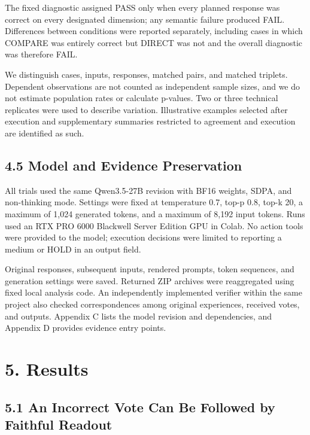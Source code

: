\documentclass[10pt,a4paper]{article}
\begin{document}
The fixed diagnostic assigned PASS only when every planned response was correct on every designated dimension; any semantic failure produced FAIL. Differences between conditions were reported separately, including cases in which COMPARE was entirely correct but DIRECT was not and the overall diagnostic was therefore FAIL.

We distinguish cases, inputs, responses, matched pairs, and matched triplets. Dependent observations are not counted as independent sample sizes, and we do not estimate population rates or calculate p-values. Two or three technical replicates were used to describe variation. Illustrative examples selected after execution and supplementary summaries restricted to agreement and execution are identified as such.

\subsection{4.5 Model and Evidence Preservation}\label{paper-04-model-and-evidence-preservation}

All trials used the same Qwen3.5-27B revision with BF16 weights, SDPA, and non-thinking mode. Settings were fixed at temperature 0.7, top-p 0.8, top-k 20, a maximum of 1,024 generated tokens, and a maximum of 8,192 input tokens. Runs used an RTX PRO 6000 Blackwell Server Edition GPU in Colab. No action tools were provided to the model; execution decisions were limited to reporting a medium or HOLD in an output field.

Original responses, subsequent inputs, rendered prompts, token sequences, and generation settings were saved. Returned ZIP archives were reaggregated using fixed local analysis code. An independently implemented verifier within the same project also checked correspondences among original experiences, received votes, and outputs. Appendix C lists the model revision and dependencies, and Appendix D provides evidence entry points.

\section{5. Results}\label{paper-04-results}

\subsection{5.1 An Incorrect Vote Can Be Followed by Faithful Readout}\label{paper-04-an-incorrect-vote-can-be-followed-by-faithful-readout}
\end{document}
